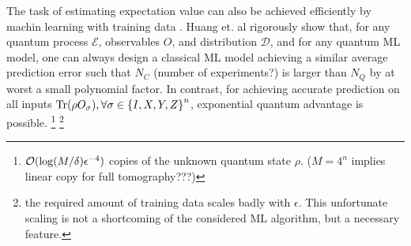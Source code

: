 \documentclass[
aps,
pra,
twocolumn,
floatfix,
]{revtex4-2}
\theoremstyle{plain}
\newtheorem{theorem}{Theorem}
\theoremstyle{definition}
\newcommand{\ob}{O}
\newcommand{\pob}{O}
\newcommand{\dm}{\rho}
\begin{document}
The task of estimating expectation value can also be achieved efficiently by machin learning with training data \cite{gaoEfficientRepresentationQuantum2017} \cite{torlaiManybodyQuantumState2018} \cite{huangPowerDataQuantum2021} \cite{huangProvablyEfficientMachine2022} \cite{zhuFlexibleLearningQuantum2022}.
Huang et. al rigorously show that, for any quantum process $\mathcal{E}$, observables $\ob$, and distribution $\mathcal{D}$, and for any quantum ML model, one can always design a classical ML model achieving a similar average prediction error such that $N_C$ (number of experiments?) is larger than $N_Q$ by at worst a small polynomial factor.
In contrast, for achieving accurate prediction on all inputs $\Tr(\dm\pob_{\sigma} ), \forall \sigma \in \qty{ I, X, Y, Z }^n$, exponential quantum advantage is possible.
\cite{huangInformationtheoreticBoundsQuantum2021}
	\footnote{
		$\mathcal{O}(\log(M/\delta)\epsilon^{-4})$ copies of the unknown quantum state $\dm$.
		($M=4^n$ implies linear copy for full tomography???)
	}
	\footnote{
		the required amount of training data scales badly with $\epsilon$. This unfortunate scaling is not a shortcoming of the considered ML algorithm, but a necessary feature.
	}
\end{document}
